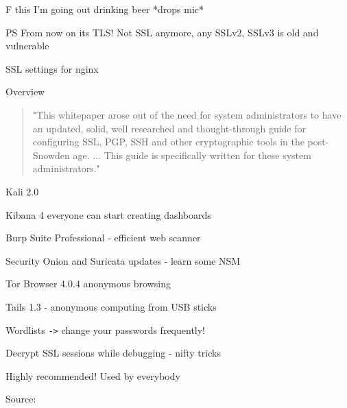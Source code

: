 \documentclass[20pt,landscape,a4paper,footrule]{foils}
\begin{document}
\vskip 1cm
\centerline{F this I'm going out drinking beer *drops mic*}



\vskip 1cm
PS From now on its TLS! Not SSL anymore, any SSLv2, SSLv3 is old and vulnerable



SSL settings for nginx

Overview
\begin{quote}
"This whitepaper arose out of the need for system administrators to have an updated,
solid, well researched and thought-through guide for configuring SSL, PGP, SSH and
other cryptographic tools in the post-Snowden age. ... This guide is specifically
written for these system administrators."
\end{quote}




\begin{list1}
\item Kali 2.0
\item Kibana 4 everyone can start creating dashboards
\item Burp Suite Professional - efficient web scanner
\item Security Onion and Suricata updates - learn some NSM
\item Tor Browser 4.0.4 anonymous browsing
\item Tails 1.3 - anonymous computing from USB sticks
\item Wordlists \verb+->+ change your passwords frequently!
\item Decrypt SSL sessions while debugging - nifty tricks
\end{list1}




\centerline{Highly recommended! Used by everybody}

Source:\\

\end{document}
